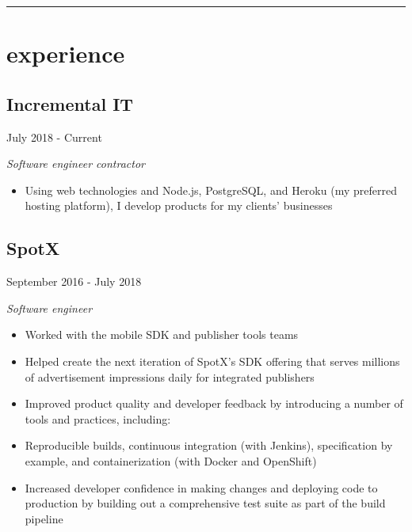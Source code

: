 \setlength{\parindent}{0cm}
\setlength{\parskip}{0.5em}

\begin{samepage}
  \hrule
  \section*{experience}
\end{samepage}

\noindent\begin{minipage}[t]{0.5\textwidth}
  \subsection*{Incremental IT}
\end{minipage}
\noindent\begin{minipage}[t]{0.5\textwidth}
  \flushright
  July 2018 - Current
\end{minipage}

\emph{Software engineer contractor}

\begin{itemize}
\item Using web technologies and Node.js, PostgreSQL, and Heroku (my preferred
  hosting platform), I develop products for my clients' businesses
\end{itemize}

\noindent\begin{minipage}[t]{0.5\textwidth}
  \subsection*{SpotX}
\end{minipage}
\noindent\begin{minipage}[t]{0.5\textwidth}
  \flushright
  September 2016 - July 2018
\end{minipage}

\emph{Software engineer}

\begin{itemize}
\item Worked with the mobile SDK and publisher tools teams
\item Helped create the next iteration of SpotX's SDK offering that serves
  millions of advertisement impressions daily for integrated publishers
\item Improved product quality and developer feedback by introducing a number of
  tools and practices, including:
\item Reproducible builds, continuous integration (with
  Jenkins), specification by example, and containerization (with
  Docker and OpenShift)
\item Increased developer confidence in making changes and deploying code to
  production by building out a comprehensive test suite as part of the build
  pipeline
\end{itemize}

